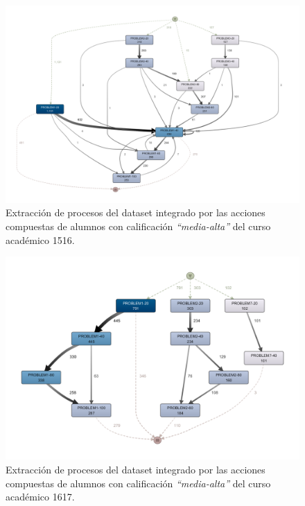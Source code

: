 \begin{figure}[H]
    \centering
    \includegraphics[width=1.25\textwidth]{imagenes/Year1516MidHighGrades.png}
    \caption{Extracción de procesos del dataset integrado por las acciones compuestas de alumnos con calificación \emph{``media-alta''} del curso académico 1516.}
    \label{fig:year1516MidHighGrades}
\end{figure}

\begin{figure}[H]
    \centering
    \includegraphics[width=1.25\textwidth]{imagenes/Year1617MidHighGrades.png}
    \caption{Extracción de procesos del dataset integrado por las acciones compuestas de alumnos con calificación \emph{``media-alta''} del curso académico 1617.}
    \label{fig:year1617MidHighGrades}
\end{figure}

